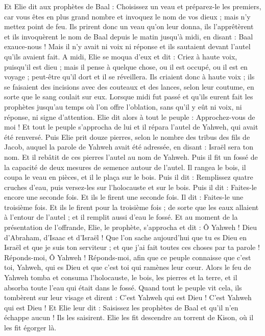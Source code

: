 \begin{multicols}{2}
Et Elie dit aux prophètes de Baal : Choisissez un veau et préparez-le les premiers, car vous êtes en plus grand nombre et invoquez le nom de vos dieux ; mais n'y mettez point de feu.
Ils prirent donc un veau qu'on leur donna, ils l'apprêtèrent et ils invoquèrent le nom de Baal depuis le matin jusqu'à midi, en disant : Baal exauce-nous ! Mais il n'y avait ni voix ni réponse et ils sautaient devant l'autel qu'ils avaient fait.
A midi, Elie se moqua d'eux et dit : Criez à haute voix, puisqu’il est dieu ; mais il pense à quelque chose, ou il est occupé, ou il est en voyage ; peut-être qu'il dort et il se réveillera.
Ils criaient donc à haute voix ; ils se faisaient des incisions avec des couteaux et des lances, selon leur coutume, en sorte que le sang coulait sur eux.
Lorsque midi fut passé et qu'ils eurent fait les prophètes jusqu'au temps où l’on offre l'oblation, sans qu'il y eût ni voix, ni réponse, ni signe d’attention.
Elie dit alors à tout le peuple : Approchez-vous de moi ! Et tout le peuple s'approcha de lui et il répara l'autel de Yahweh, qui avait été renversé.
Puis Elie prit douze pierres, selon le nombre des tribus des fils de Jacob, auquel la parole de Yahweh avait été adressée, en disant : Israël sera ton nom.
Et il rebâtit de ces pierres l'autel au nom de Yahweh. Puis il fit un fossé de la capacité de deux mesures de semence autour de l'autel.
Il rangea le bois, il coupa le veau en pièces, et il le plaça sur le bois.
Puis il dit : Remplissez quatre cruches d'eau, puis versez-les sur l'holocauste et sur le bois. Puis il dit : Faites-le encore une seconde fois. Et ils le firent une seconde fois. Il dit : Faites-le une troisième fois. Et ils le firent pour la troisième fois ;
de sorte que les eaux allaient à l'entour de l'autel ; et il remplit aussi d’eau le fossé.
Et au moment de la présentation de l’offrande, Elie, le prophète, s'approcha et dit : Ô Yahweh ! Dieu d'Abraham, d'Isaac et d'Israël ! Que l’on sache aujourd'hui que tu es Dieu en Israël et que je suis ton serviteur ; et que j'ai fait toutes ces choses par ta parole !
Réponds-moi, Ô Yahweh ! Réponds-moi, afin que ce peuple connaisse que c’est toi, Yahweh, qui es Dieu et que c'est toi qui ramènes leur cœur.
Alors le feu de Yahweh tomba et consuma l'holocauste, le bois, les pierres et la terre, et il absorba toute l'eau qui était dans le fossé.
Quand tout le peuple vit cela, ils tombèrent sur leur visage et dirent : C'est Yahweh qui est Dieu ! C'est Yahweh qui est Dieu !
Et Elie leur dit : Saisissez les prophètes de Baal et qu'il n'en échappe aucun ! Ils les saisirent. Elie les fit descendre au torrent de Kison, où il les fit égorger là.

\end{multicols}
